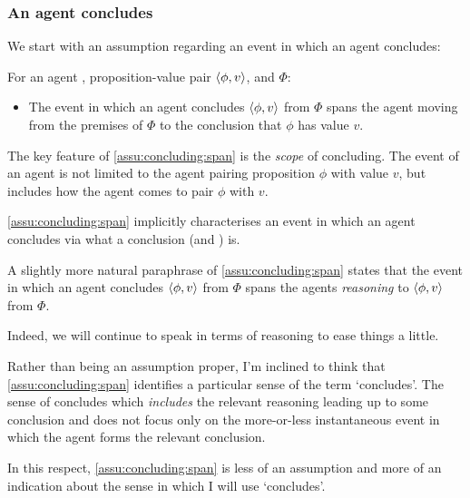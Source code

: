 \subsubsection{An agent concludes}
\label{sec:event-which-an}

\begin{note}
  We start with an assumption regarding an event in which an agent concludes:

  \begin{assumption}
    \label{assu:concluding:span}
    For an agent \vAgent{}, proposition-value pair \(\langle \phi, v \rangle\), and \poP{} \(\Phi\):

    \begin{itemize}
    \item
      The event in which an agent concludes \(\langle \phi, v \rangle\) from \(\Phi\) spans the agent moving from the premises of \(\Phi\) to the conclusion that \(\phi\) has value \(v\).
    \end{itemize}
    \vspace{-\baselineskip}
  \end{assumption}

  The key feature of \autoref{assu:concluding:span}  is the \emph{scope} of concluding.
  The event of an agent is not limited to the agent pairing proposition \(\phi\) with value \(v\), but includes how the agent comes to pair \(\phi\) with \(v\).

  \autoref{assu:concluding:span} implicitly characterises an event in which an agent concludes via what a conclusion (and \poP{}) is.

  A slightly more natural paraphrase of \autoref{assu:concluding:span} states that the event in which an agent concludes \(\langle \phi, v \rangle\) from \(\Phi\) spans the agents \emph{reasoning} to \(\langle \phi, v \rangle\) from \(\Phi\).

  Indeed, we will continue to speak in terms of reasoning to ease things a little.
\end{note}

\begin{note}
  Rather than being an assumption proper, I'm inclined to think that \autoref{assu:concluding:span} identifies a particular sense of the term `concludes'.
  The sense of concludes which \emph{includes} the relevant reasoning leading up to some conclusion and does not focus only on the more-or-less instantaneous event in which the agent forms the relevant conclusion.

  In this respect, \autoref{assu:concluding:span} is less of an assumption and more of an indication about the sense in which I will use `concludes'.
\end{note}

